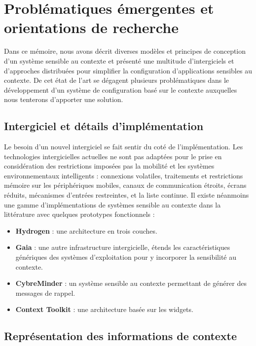 \chapter{Problématiques émergentes et orientations de recherche}

Dans ce mémoire, nous avons décrit diverses modèles et principes de conception
d'un système sensible au contexte et présenté une multitude d'intergiciels et
d'approches distribuées pour simplifier la configuration d'applications
sensibles au contexte. De cet état de l'art se dégagent plusieurs problématiques
dans le développement d'un système de configuration basé sur le contexte
auxquelles nous tenterons d'apporter une solution.

\section{Intergiciel et détails d'implémentation}

Le besoin d'un nouvel intergiciel se fait sentir du coté de l'implémentation.
Les technologies intergicielles actuelles ne sont pas adaptées pour le prise en
considération des restrictions imposées pas la mobilité et les systèmes
environnementaux intelligents : connexions volatiles, traitements et restrictions
mémoire sur les périphériques mobiles, canaux de communication étroits, écrans
réduits, mécanismes d'entrées restreintes, et la liste continue. Il existe
néanmoins une gamme d'implémentations de systèmes sensible au contexte dans la
littérature avec quelques prototypes fonctionnels :

\begin{itemize}
    \item \textbf{Hydrogen} \cite{hofer_context-awareness_2003}: 
        une architecture en trois couches.
    \item \textbf{Gaia} \cite{chetan_mobile_2005}: 
        une autre infrastructure intergicielle, étends les caractéristiques
        génériques des systèmes d'exploitation pour y incorporer la
        sensibilité au contexte.
    \item \textbf{CybreMinder} \cite{abowd_context-aware_2002}: 
        un système sensible au contexte permettant de générer des messages
        de rappel.
    \item \textbf{Context Toolkit} \cite{dey_conceptual_2001}: 
	    une architecture basée sur les widgets.
\end{itemize}

\section{Représentation des informations de contexte}

